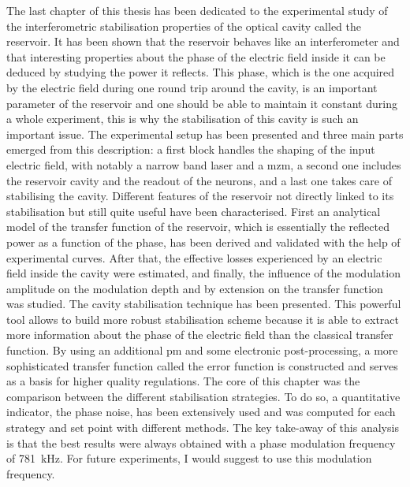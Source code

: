 The last chapter of this thesis has been dedicated to the experimental study of the interferometric stabilisation properties of the optical cavity called the reservoir. It has been shown that the reservoir behaves like an interferometer and that interesting properties about the phase of the electric field inside it can be deduced by studying the power it reflects. This phase, which is the one acquired by the electric field during one round trip around the cavity, is an important parameter of the reservoir and one should be able to maintain it constant during a whole experiment, this is why the stabilisation of this cavity is such an important issue. The experimental setup has been presented and three main parts emerged from this description: a first block handles the shaping of the input electric field, with notably a narrow band laser and a \gls{mzm}, a second one includes the reservoir cavity and the readout of the neurons, and a last one takes care of stabilising the cavity. Different features of the reservoir not directly linked to its stabilisation but still quite useful have been characterised. First an analytical model of the transfer function of the reservoir, which is essentially the reflected power as a function of the phase, has been derived and validated with the help of experimental curves. After that, the effective losses experienced by an electric field inside the cavity were estimated, and finally, the influence of the modulation amplitude on the modulation depth and by extension on the transfer function was studied. The \pdh cavity stabilisation technique has been presented. This powerful tool allows to build more robust stabilisation scheme because it is able to extract more information about the phase of the electric field than the classical transfer function. By using an additional \gls{pm} and some electronic post-processing, a more sophisticated transfer function called the error function is constructed and serves as a basis for higher quality regulations. The core of this chapter was the comparison between the different stabilisation strategies. To do so, a quantitative indicator, the phase noise, has been extensively used and was computed for each strategy and set point with different methods. The key take-away of this analysis is that the best results were always obtained with a \pdh phase modulation frequency of \SI{781}{\kilo\hertz}. For future \rcer experiments, I would suggest to use this modulation frequency.\\

